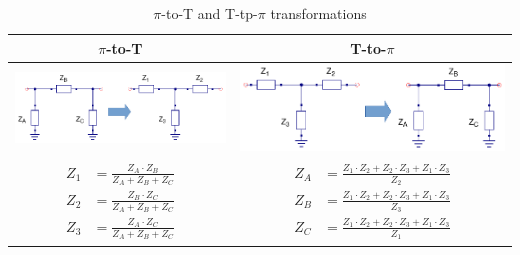 \begin{table}[H]
  \centering
  \begin{tabular}{ | c | c | }
    \hline
    $\pi$-to-T & T-to-$\pi$\\ \hline
    \begin{minipage}{.4\textwidth}
      \includegraphics[width=\linewidth]{Pi-to-tee-transformation}
    \end{minipage}
    &
    \begin{minipage}{.4\textwidth}
      \includegraphics[width=\linewidth]{Tee-to-pi-transformation}
    \end{minipage}
    \\ \hline
    \begin{minipage}{.4\textwidth}
         {\begin{align}
           Z_1 &= \frac{Z_A \cdot Z_B}{Z_A + Z_B + Z_C}\\
           Z_2 &= \frac{Z_B \cdot Z_C}{Z_A + Z_B + Z_C}\\
           Z_3 &= \frac{Z_A \cdot Z_C}{Z_A + Z_B + Z_C}
         \end{align}}
    \end{minipage}
    &
        \begin{minipage}{.4\textwidth}
         {\begin{align}
           Z_A &= \frac{Z_1 \cdot Z_2 + Z_2 \cdot Z_3 + Z_1 \cdot Z_3}{Z_2}\\
           Z_B &= \frac{Z_1 \cdot Z_2 + Z_2 \cdot Z_3 + Z_1 \cdot Z_3}{Z_3}\\
           Z_C &= \frac{Z_1 \cdot Z_2 + Z_2 \cdot Z_3 + Z_1 \cdot Z_3}{Z_1}
         \end{align}}
    \end{minipage}
    \\ \hline
  \end{tabular}
  \caption{$\pi$-to-T and T-tp-$\pi$ transformations \cite{ElectricalCommunicationAAlbert}}
  \label{tbl:pi-to-tee-transformation}
\end{table}


